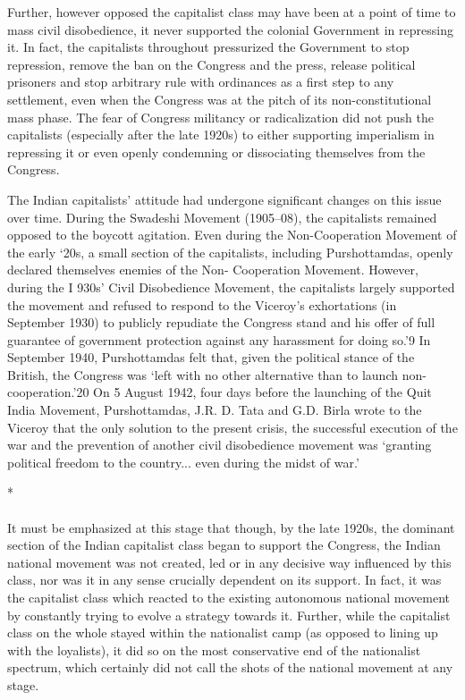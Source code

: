 Further, however opposed the capitalist class may have been at a point of time to mass civil disobedience, it never supported the colonial Government in repressing it. In fact, the capitalists throughout pressurized the Government to stop repression, remove the ban on the Congress and the press, release political prisoners and stop arbitrary rule with ordinances as a first step to any settlement, even when the Congress was at the pitch of its non-constitutional mass phase. The fear of Congress militancy or radicalization did not push the capitalists (especially after the late 1920s) to either supporting imperialism in repressing it or even openly condemning or dissociating themselves from the Congress. 

The Indian capitalists' attitude had undergone significant changes on this issue over time. During the Swadeshi Movement (1905--08), the capitalists remained opposed to the boycott agitation. Even during the Non-Cooperation Movement of the early `20s, a small section of the capitalists, including Purshottamdas, openly declared themselves enemies of the Non- Cooperation Movement. However, during the I 930s' Civil Disobedience Movement, the capitalists largely supported the movement and refused to respond to the Viceroy's exhortations (in September 1930) to publicly repudiate the Congress stand and his offer of full guarantee of government protection against any harassment for doing so.'9 In September 1940, Purshottamdas felt that, given the political stance of the British, the Congress was `left with no other alternative than to launch non-cooperation.'20 On 5 August 1942, four days before the launching of the Quit India Movement, Purshottamdas, J.R. D. Tata and G.D. Birla wrote to the Viceroy that the only solution to the present crisis, the successful execution of the war and the prevention of another civil disobedience movement was `granting political freedom to the country... even during the midst of war.'

\begin{center}*\end{center}

\paragraph*{}

It must be emphasized at this stage that though, by the late 1920s, the dominant section of the Indian capitalist class began to support the Congress, the Indian national movement was not created, led or in any decisive way influenced by this class, nor was it in any sense crucially dependent on its support. In fact, it was the capitalist class which reacted to the existing autonomous national movement by constantly trying to evolve a strategy towards it. Further, while the capitalist class on the whole stayed within the nationalist camp (as opposed to lining up with the loyalists), it did so on the most conservative end of the nationalist spectrum, which certainly did not call the shots of the national movement at any stage. 

